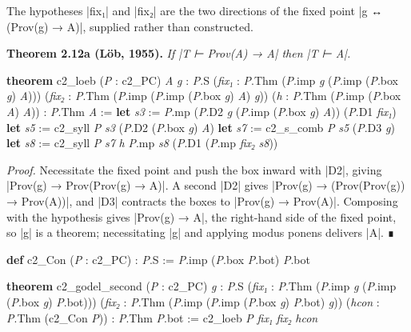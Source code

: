 \documentclass{memoir}
\begin{document}
The hypotheses \LeanVerb|fix₁| and \LeanVerb|fix₂| are the two directions of the fixed point \LeanVerb|g ↔ (Prov(g) → A)|,
supplied rather than constructed.

\textbf{Theorem 2.12a (Löb, 1955).} \emph{If \LeanVerb|T ⊢ Prov(A) → A| then \LeanVerb|T ⊢ A|.}

\begin{LeanVerbatim}
\textbf{theorem} c2_loeb (\textit{P} : c2_PC) \textit{A} \textit{g} : \textit{P}.S
    (\textit{fix₁} : \textit{P}.Thm (\textit{P}.imp \textit{g} (\textit{P}.imp (\textit{P}.box \textit{g}) \textit{A})))
    (\textit{fix₂} : \textit{P}.Thm (\textit{P}.imp (\textit{P}.imp (\textit{P}.box \textit{g}) \textit{A}) \textit{g}))
    (\textit{h} : \textit{P}.Thm (\textit{P}.imp (\textit{P}.box \textit{A}) \textit{A})) :
    \textit{P}.Thm \textit{A} :=
  \textbf{let} \textit{s3} := \textit{P}.mp (\textit{P}.D2 \textit{g} (\textit{P}.imp (\textit{P}.box \textit{g}) \textit{A})) (\textit{P}.D1 \textit{fix₁})
  \textbf{let} \textit{s5} := c2_syll \textit{P} \textit{s3} (\textit{P}.D2 (\textit{P}.box \textit{g}) \textit{A})
  \textbf{let} \textit{s7} := c2_s_comb \textit{P} \textit{s5} (\textit{P}.D3 \textit{g})
  \textbf{let} \textit{s8} := c2_syll \textit{P} \textit{s7} \textit{h}
  \textit{P}.mp \textit{s8} (\textit{P}.D1 (\textit{P}.mp \textit{fix₂} \textit{s8}))

\end{LeanVerbatim}


\emph{Proof.} Necessitate the fixed point and push the box inward with \LeanVerb|D2|, giving
\LeanVerb|Prov(g) → Prov(Prov(g) → A)|. A second \LeanVerb|D2| gives \LeanVerb|Prov(g) → (Prov(Prov(g)) → Prov(A))|,
and \LeanVerb|D3| contracts the boxes to \LeanVerb|Prov(g) → Prov(A)|. Composing with the
hypothesis gives \LeanVerb|Prov(g) → A|, the right-hand side of the fixed point, so \LeanVerb|g|
is a theorem; necessitating \LeanVerb|g| and applying modus ponens delivers \LeanVerb|A|. ∎

\begin{LeanVerbatim}
\textbf{def} c2_Con (\textit{P} : c2_PC) : \textit{P}.S := \textit{P}.imp (\textit{P}.box \textit{P}.bot) \textit{P}.bot

\textbf{theorem} c2_godel_second (\textit{P} : c2_PC) \textit{g} : \textit{P}.S
    (\textit{fix₁} : \textit{P}.Thm (\textit{P}.imp \textit{g} (\textit{P}.imp (\textit{P}.box \textit{g}) \textit{P}.bot)))
    (\textit{fix₂} : \textit{P}.Thm (\textit{P}.imp (\textit{P}.imp (\textit{P}.box \textit{g}) \textit{P}.bot) \textit{g}))
    (\textit{hcon} : \textit{P}.Thm (c2_Con \textit{P})) :
    \textit{P}.Thm \textit{P}.bot :=
  c2_loeb \textit{P} \textit{fix₁} \textit{fix₂} \textit{hcon}

\end{LeanVerbatim}
\end{document}
